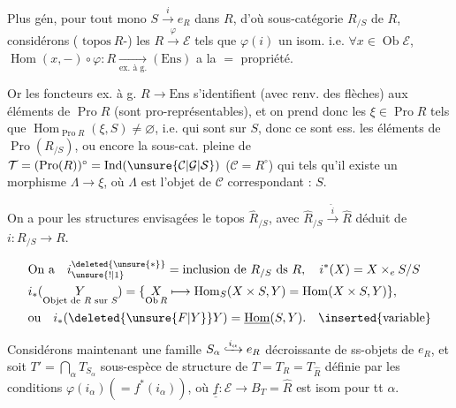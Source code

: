 Plus gén, pour tout mono $S\xrightarrow{i}e_R$ dans $R$,
d'où sous-catégorie $R_{/S}$ de $R$,  considérons
( $\mathrm{topos}\ R$-) les $R\xrightarrow{\varphi}\mathcal E$  tels que $\varphi(i)$ un isom.
i.e. $\forall x\in\operatorname{Ob}\mathcal E$, $\operatorname{Hom}(x,-)\circ\varphi:R\underset{\text{ex. à g.}}{\longrightarrow}(\mathrm{Ens})$ a la $=$ propriété.

Or les foncteurs ex. à g.  $R\to\mathrm{Ens}$ s'identifient (avec renv. des flèches)
aux éléments de $\operatorname{Pro}R$ (sont pro-représentables), et on prend donc les $\xi\in\operatorname{Pro}R$ tels que
$\operatorname{Hom}_{\operatorname{Pro}R}(\xi,S)\ne\varnothing$, i.e. qui sont sur $S$,
donc ce sont ess. les éléments de $\operatorname{Pro}(R_{/S})$,  ou encore la sous-cat. pleine de
$\mathcal T=(\operatorname{Pro}(R))^\circ=\operatorname{Ind}(\unsure{\mathcal C|\mathcal G|\mathcal S})$ ($\mathcal C=R^\circ$)
 qui  tels qu'il existe un morphisme $\Lambda\to\xi$, où $\Lambda$ est l'objet de $\mathcal C$ correspondant : $S$.

On a pour les structures envisagées le topos 
$\widehat R_{/S}$, avec $\widehat R_{/S}\xrightarrow{\widehat i}\widehat R$ déduit de $i:R_{/S}\to R$.

\[
\begin{aligned}
 &\text{On a}\quad i_{\unsure{!|1}}^{\deleted{\unsure{*}}}=\text{inclusion de $R_{/S}$ ds $R$},
 \quad i^*(X)=X\times_e S/S\\
 &i_*(\underset{\text{Objet de $R$ sur $S$}}Y)
 =\{ \underset{\operatorname{Ob}R}{X}\longmapsto\operatorname{Hom}_S(X\times S,Y)=\operatorname{Hom}(X\times S,Y)\},\\
 &\text{ou}\quad i_*(\deleted{\unsure{F|Y}}Y)=\underline{\operatorname{Hom}}(S,Y).
 \quad\inserted{\text{variable}}
\end{aligned}
\]

Considérons maintenant une famille $S_\alpha\lhook\joinrel\xrightarrow{i_\alpha}e_R$  décroissante
de ss-objets de $e_R$, et soit $T'=\bigcap_\alpha T_{S_\alpha}$  sous-espèce de structure de $T=T_R=T_{\widehat R}$
définie par les conditions $\varphi(i_\alpha)(=f^*(i_\alpha))$, où $\underline{\underline f}:\mathcal E\to B_T=\widehat R$ est isom pour tt $\alpha$.

